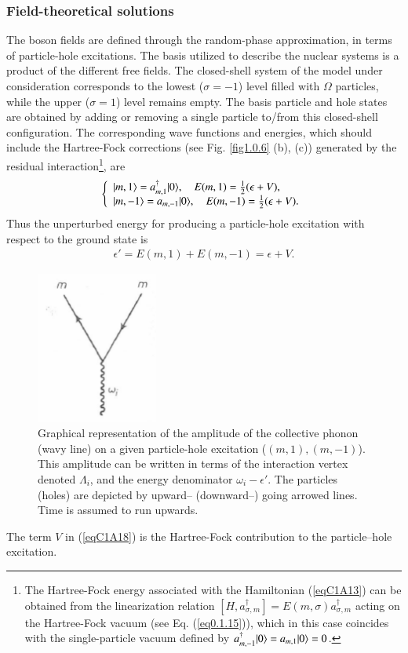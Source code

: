 \subsubsection{Field-theoretical solutions}
 The boson fields are defined through the random-phase
approximation, in terms of particle-hole excitations. The basis utilized to
describe the nuclear systems is a product of the different free fields. 
The closed-shell system of the  model under consideration corresponds to the lowest ($\sigma = - 1$) level filled with $\Omega$ particles, while the upper
($\sigma =  1$) level remains empty. The basis particle and hole states are obtained
by adding or removing a single particle to/from this closed-shell configuration.
The corresponding wave functions and energies, which should include the
Hartree-Fock corrections (see Fig. \ref{fig1.0.6} (b), (c)) generated by the residual interaction\footnote{The Hartree-Fock energy associated with the Hamiltonian (\ref{eqC1A13}) can be obtained
from the linearization relation $[H,a_{\sigma,m}^\dagger]=E(m,\sigma)a^\dagger_{\sigma,m}$ acting on the Hartree-Fock
vacuum (see Eq. (\ref{eq0.1.15})), which in this case coincides with the single-particle vacuum defined by
 $a^\dagger_{m,-1}|{0} \rangle=a_{m,1}|{0} \rangle=0$.}, are
 \begin{align}\label{eqC1A17} 
\left\{\begin{array}{l}
 |{m,1} \rangle=a^\dagger_{m,1}|{0} \rangle,\quad E(m,1)=\frac{1}{2}(\epsilon+V),\\ 
|{m,-1} \rangle=a_{m,-1}|{0} \rangle,\quad E(m,-1)=\frac{1}{2}(\epsilon+V).
\end{array} \right.
 \end{align}
Thus the unperturbed energy for producing a particle-hole excitation with
respect to the ground state is
 \begin{align}\label{eqC1A18} 
\epsilon'=E(m,1)+E(m,-1)=\epsilon+V.
 \end{align}
 \begin{figure}
 \centerline {
 \includegraphics*[width=4cm]{introduccion/figs/fig18}
 }
 \caption{Graphical representation of the amplitude of the collective phonon (wavy line) on a given particle-hole excitation ($(m,1),(m,-1)$). This amplitude can be written in terms of the interaction vertex denoted  $\Lambda_i$, and the energy denominator $\omega_i-\epsilon'$. The particles (holes) are depicted by upward-- (downward--) going arrowed lines. Time is assumed to run upwards.}
 \label{figC1A1}
 \end{figure}
The term $V$ in (\ref{eqC1A18}) is the Hartree-Fock contribution to the particle--hole excitation.

